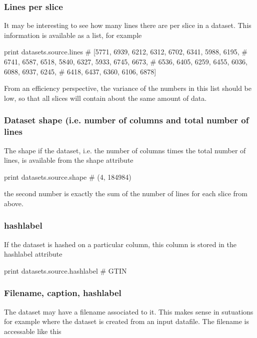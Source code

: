 \subsubsection{Lines per slice}

It may be interesting to see how many lines there are per slice in a
dataset.  This information is available as a list, for example

\begin{python}
print datasets.source.lines
# [5771, 6939, 6212, 6312, 6702, 6341, 5988, 6195,
#  6741, 6587, 6518, 5840, 6327, 5933, 6745, 6673,
#  6536, 6405, 6259, 6455, 6036, 6088, 6937, 6245,
#  6418, 6437, 6360, 6106, 6878]
\end{python}
From an efficiency perspective, the variance of the numbers in this
list should be low, so that all slices will contain about the same
amount of data.

\subsubsection{Dataset shape (i.e. number of columns and total number
  of lines}

The shape if the dataset, i.e. the number of columns times the total
number of lines, is available from the shape attribute

\begin{python}
print datasets.source.shape
# (4, 184984)
\end{python}
the second number is exactly the sum of the number of lines for each
slice from above.



\subsubsection{hashlabel}
If the dataset is hashed on a particular column, this column is stored
in the hashlabel attribute

\begin{python}
print datasets.source.hashlabel
# GTIN
\end{python}



\subsubsection{Filename, caption, hashlabel}

The dataset may have a filename associated to it.  This makes sense in
sutuations for example where the dataset is created from an input
datafile.  The filename is accessable like this

